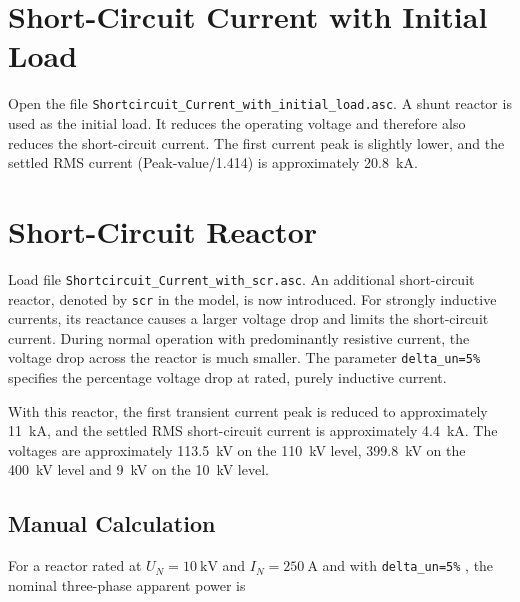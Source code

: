 \section{Short-Circuit Current with Initial Load}
\label{sec:section25}
Open the file \texttt{Shortcircuit\_Current\_with\_initial\_load.asc}.
A shunt reactor is used as the initial load. It reduces the operating voltage
and therefore also reduces the short-circuit current. The first current peak is
slightly lower, and the settled RMS current (Peak-value/1.414) is approximately
\SI{20.8}{\kilo\ampere}.

\section{Short-Circuit Reactor}
\label{sec:section26}
Load file  \texttt{Shortcircuit\_Current\_with\_scr.asc}.
An additional short-circuit reactor, denoted by \texttt{scr} in the model, is
now introduced. For strongly inductive currents, its reactance causes a larger
voltage drop and limits the short-circuit current. During normal operation with
predominantly resistive current, the voltage drop across the reactor is much
smaller. The parameter \texttt{delta\_un=5\%} specifies the percentage voltage
drop at rated, purely inductive current.

With this reactor, the first transient current peak is reduced to approximately
\SI{11}{\kilo\ampere}, and the settled RMS short-circuit current is
approximately \SI{4.4}{\kilo\ampere}. The voltages are approximately
\SI{113.5}{\kilo\volt} on the \SI{110}{\kilo\volt} level,
\SI{399.8}{\kilo\volt} on the \SI{400}{\kilo\volt} level and
\SI{9}{\kilo\volt} on the \SI{10}{\kilo\volt} level.
\subsection{Manual Calculation}

For a reactor rated at $U_N=\SI{10}{\kilo\volt}$ and
$I_N=\SI{250}{\ampere}$ and with \texttt{delta\_un=5\%} , the nominal three-phase apparent power is

